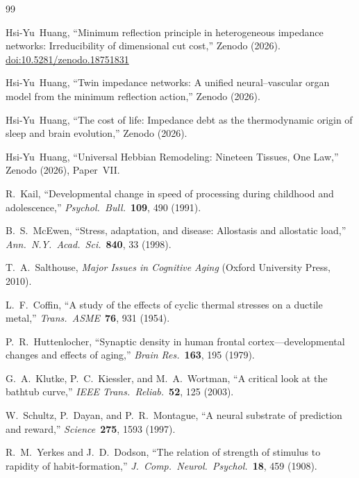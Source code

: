 ﻿\documentclass[aps,pre,twocolumn,superscriptaddress,floatfix]{revtex4-2}
\begin{document}
\begin{thebibliography}{99}

Hsi-Yu~Huang,
``Minimum reflection principle in heterogeneous impedance networks:
Irreducibility of dimensional cut cost,''
Zenodo (2026).
\href{https://doi.org/10.5281/zenodo.18751831}{doi:10.5281/zenodo.18751831}

Hsi-Yu~Huang,
``Twin impedance networks: A unified neural--vascular organ model
from the minimum reflection action,''
Zenodo (2026).

Hsi-Yu~Huang,
``The cost of life: Impedance debt as the thermodynamic
origin of sleep and brain evolution,''
Zenodo (2026).

Hsi-Yu~Huang,
``Universal Hebbian Remodeling: Nineteen Tissues, One Law,''
Zenodo (2026), Paper~VII.

R.~Kail,
``Developmental change in speed of processing during childhood
and adolescence,''
\emph{Psychol.\ Bull.}\ \textbf{109}, 490 (1991).

B.~S.~McEwen,
``Stress, adaptation, and disease: Allostasis and allostatic load,''
\emph{Ann.\ N.Y.\ Acad.\ Sci.}\ \textbf{840}, 33 (1998).

T.~A.~Salthouse,
\emph{Major Issues in Cognitive Aging}
(Oxford University Press, 2010).

L.~F.~Coffin,
``A study of the effects of cyclic thermal stresses
on a ductile metal,''
\emph{Trans.\ ASME}\ \textbf{76}, 931 (1954).

P.~R.~Huttenlocher,
``Synaptic density in human frontal cortex---developmental
changes and effects of aging,''
\emph{Brain Res.}\ \textbf{163}, 195 (1979).

G.~A.~Klutke, P.~C.~Kiessler, and M.~A.~Wortman,
``A critical look at the bathtub curve,''
\emph{IEEE Trans.\ Reliab.}\ \textbf{52}, 125 (2003).

W.~Schultz, P.~Dayan, and P.~R.~Montague,
``A neural substrate of prediction and reward,''
\emph{Science}\ \textbf{275}, 1593 (1997).

R.~M.~Yerkes and J.~D.~Dodson,
``The relation of strength of stimulus to rapidity
of habit-formation,''
\emph{J.\ Comp.\ Neurol.\ Psychol.}\ \textbf{18}, 459 (1908).


\end{thebibliography}
\end{document}
